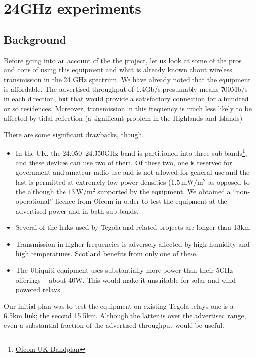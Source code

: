 \section{24GHz experiments}\label{ghz-experiments}

\subsection{Background}\label{background}

Before going into an account of the the project, let us look at some of
the pros and cons of using this equipment and what is already
known about wireless transmission in the 24 GHz spectrum. We have
already noted that the equipment is affordable. The advertised
throughput of 1.4Gb/s presumably means 700Mb/s in each direction, but
that would provide a satisfactory connection for a hundred or
so residences. Moreover, transmission in this frequency is much
less likely to be affected by tidal reflection (a significant problem
in the Highlands and Islands)

There are some significant drawbacks, though.

\begin{itemize}
\item
  In the UK, the 24.050--24.350GHz band is partitioned into three
  sub-bands\footnote{\href{http://www.ofcom.org.uk/static/archive/ra/publication/ra_info/ra365.htm}{Ofcom
    UK Bandplan}}, and these devices can use two of them. Of these two, one
  is reserved for government and amateur radio use and is not allowed
  for general use and the last is permitted at extremely low power
  densities ($1.5\,\text{mW}/\text{m}^2$ as opposed to the although
  the $13\,\text{W}/\text{m}^2$
  supported by the equipment.  We obtained a ``non-operational''
  licence from Ofcom in order to test the equipment at the advertised
  power and in both sub-bands.
\item
  Several of the links used by Tegola and related projects are longer 
  than 13km
\item
  Transmission in higher frequencies is adversely affected by high 
  humidity and high temperatures. Scotland benefits from only one of 
  these.
\item
  The Ubiquiti equipment uses substantially more power than their 5GHz 
  offerings -- about 40W. This would make it unsuitable for solar and 
  wind-powered relays.
\end{itemize}

Our initial plan was to test the equipment on existing Tegola
relays one is a 6.5km link; the second 15.5km. Although the latter is
over the advertised range, even a substantial fraction of the
advertised throughput would be useful.

